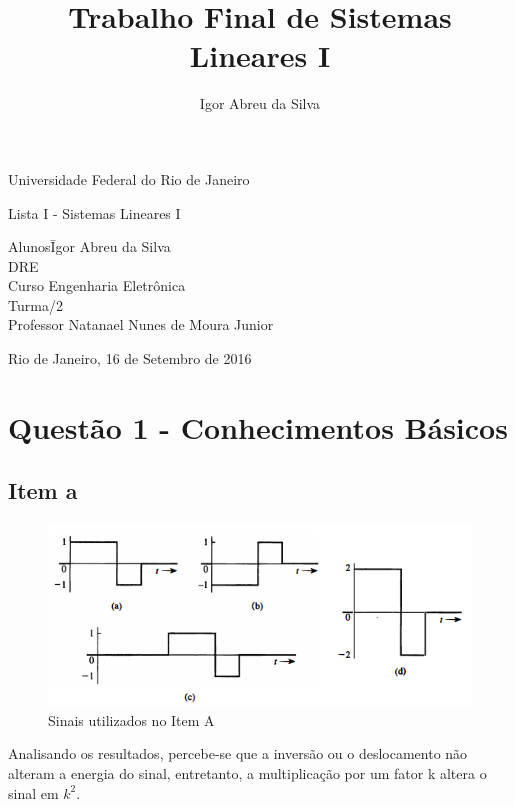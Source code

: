 \documentclass[a4paper, 12pt]{article}
\author{Igor Abreu da Silva}
\title{Trabalho Final de Sistemas Lineares I}
\begin{document}
	
	\begin{titlepage}
		\begin{center}
			\huge{Universidade Federal do Rio de Janeiro}
			\vspace{95pt}
			
			\large{Lista I - Sistemas Lineares I}
			\vspace{160pt}
		\end{center}
		
		\begin{flushleft}
			\begin{tabbing}
				Alunos\qquad\qquad\= Igor Abreu da Silva\\
				DRE \\
				Curso\> Engenharia Eletrônica \\
				Turma/2 \\
				Professor\> Natanael Nunes de Moura Junior \\
				
			\end{tabbing}
			
		\end{flushleft}
		
		\begin{center}
			\vspace{\fill}
			Rio de Janeiro, 16 de Setembro de 2016
		\end{center}
	\end{titlepage}
	
	\newpage
	\tableofcontents
	\listoffigures
	\thispagestyle{empty}
	\newpage
	
	\section{Quest\~{a}o 1 - Conhecimentos Básicos}
		\subsection{Item a}	
			\begin{figure}[!ht]
				\centering
				\includegraphics{img/Figura1.png}
				\caption{Sinais utilizados no Item A}	
			\end{figure}
			Analisando os resultados, percebe-se que a inversão ou o deslocamento não alteram a energia do sinal, entretanto, a multiplicação por um fator k altera o sinal em $k^{2}$.
\end{document}
